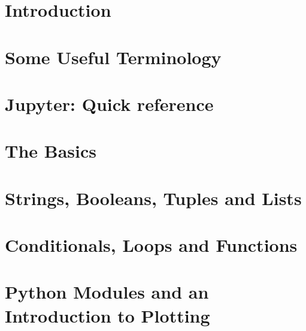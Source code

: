 \documentclass[12pt, twosides]{report}
\begin{document}

{}

%

\newpage
\clearpage
\fancyhead[r]{\leftmark}
\tableofcontents

\clearpage

\chapter{Introduction}


\chapter{Some Useful Terminology}


\chapter{Jupyter: Quick reference}


\chapter{The Basics}
\label{chap:jupyter}


\chapter{Strings, Booleans, Tuples and Lists}
\label{chap:listsloops}


\chapter{Conditionals, Loops and Functions}
\label{chap:funcs}


\chapter{Python Modules and an Introduction to Plotting}

\end{document}
